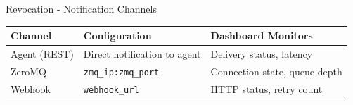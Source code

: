 \begin{frame}{Revocation - Notification Channels}
  \vspace{0.1cm}

  \scriptsize
  \begin{center}
    \begin{tabular}{|l|p{3.5cm}|l|}
      \hline
      \textbf{Channel} & \textbf{Configuration} & \textbf{Dashboard Monitors} \\
      \hline
      Agent (REST) & Direct notification to agent & Delivery status, latency \\
      \hline
      ZeroMQ & \texttt{zmq\_ip:zmq\_port} & Connection state, queue depth \\
      \hline
      Webhook & \texttt{webhook\_url} & HTTP status, retry count \\
      \hline
    \end{tabular}
  \end{center}
\end{frame}

